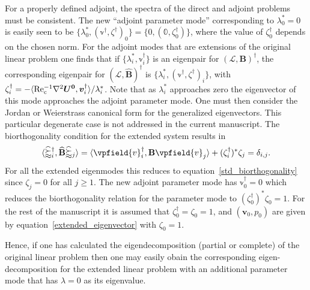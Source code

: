 For a properly defined adjoint, the spectra of the direct and adjoint problems must be consistent. The new ``adjoint parameter mode'' corresponding to $\lambda^{*}_{0} = 0$ is easily seen to be $\{\lambda^{*}_{0},(\mathbb{v}^{\dagger},\zeta^{\dagger})_{0}\} = \{0,(\mathbb{0},\zeta^{\dagger}_{0})\}$, where the value of $\zeta^{\dagger}_{0}$ depends on the chosen norm. For the adjoint modes that are extensions of the original linear problem one finds that if $\{\lambda^{*}_{i},\mathbb{v}^{\dagger}_{i}\}$ is an eigenpair for $(\mathcal{L},\mathbf{B})^{\dagger}$, the corresponding eigenpair for $(\mathcal{\widehat{L}},\mathbf{\widehat{B}})^{\dagger}$ is $\{\lambda^{*}_{i},(\mathbb{v}^{\dagger},\zeta^{\dagger})_{i}\}$, with $\zeta^{\dagger}_{i} = -\langle\mathrm{Re_{c}^{-1}}\nabla^{2}\boldsymbol{U^{0}},\boldsymbol{v}^{\dagger}_{i}\rangle/\lambda^{*}_{i}$. Note that 
as $\lambda^{*}_{i}$ approaches zero the eigenvector of this mode approaches the adjoint parameter mode. One must then consider the Jordan or Weierstrass canonical form for the generalized eigenvectors. This particular degenerate case is not addressed in the current manuscript. The biorthogonality condition for the extended system results in
\begin{eqnarray}
	\langle\mathbb{\widehat{v}}^{\dagger}_{i},\mathbf{\widehat{B}}\mathbb{\widehat{v}}_{j}\rangle = \langle\vpfield{v}^{\dagger}_{i},\mathbf{B}\vpfield{v}_{j}\rangle + (\zeta^{\dagger}_{i})^{*}\zeta_{j} = \delta_{i,j}. \label{extended_biorthogonality}
\end{eqnarray}
For all the extended eigenmodes this reduces to equation~\eqref{std_biorthogonality} since $\zeta_{j} = 0$ for all $j \ge 1$. The new adjoint parameter mode has $\mathbb{v}^{\dagger}_{0} = 0$ which reduces the biorthogonality relation for the parameter mode to $(\zeta^{\dagger}_{0})^{*}\zeta_{0} = 1$. For the rest of the manuscript it is assumed that $\zeta^{\dagger}_{0} = \zeta_{0} = 1$, and $(\boldsymbol{v}_{0},p_{0})$ are given by equation~\eqref{extended_eigenvector} with $\zeta_{0} = 1$.

Hence, if one has calculated the eigendecomposition (partial or complete) of the original linear problem then one may easily obain the corresponding eigen-decomposition for the extended linear problem with an additional parameter mode that has $\lambda = 0$ as its eigenvalue.

